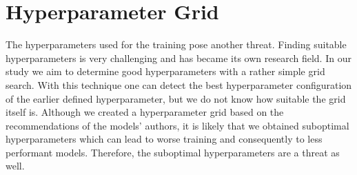\section{Hyperparameter Grid}
\label{chp:threats_to_validity:sec:hyperparameter_grid}

The hyperparameters used for the training pose another threat.
Finding suitable hyperparameters is very challenging \parencite{Zeiler:2012} and has became its own research field.
In our study we aim to determine good hyperparameters with a rather simple grid search.
With this technique one can detect the best hyperparameter configuration of the earlier defined hyperparameter, but we do not know how suitable the grid itself is.
Although we created a hyperparameter grid based on the recommendations of the models' authors, it is likely that we obtained suboptimal hyperparameters which can lead to worse training and consequently to less performant models.
Therefore, the suboptimal hyperparameters are a threat as well.
